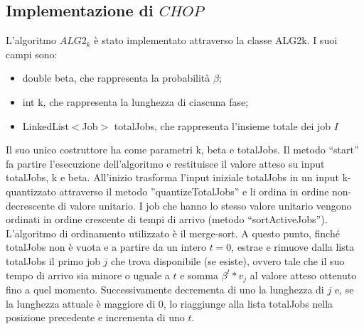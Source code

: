 \documentclass[12pt]{article}
\begin{document}
\subsection{Implementazione di $CHOP$}
L’algoritmo $ALG2_{k}$ è stato implementato attraverso la classe ALG2k. I suoi campi sono:
\begin{itemize}
\item{double beta, che rappresenta la probabilità $\beta$;}
\item{int k, che rappresenta la lunghezza di ciascuna fase;}
\item{LinkedList$<$Job$>$ totalJobs, che rappresenta l’insieme totale dei job $I$}
\end{itemize}
Il suo unico costruttore ha come parametri k, beta e totalJobs. Il metodo “start” fa partire l’esecuzione dell’algoritmo e restituisce il valore atteso su input totalJobs, k e beta. All'inizio trasforma l'input iniziale totalJobs in un input k-quantizzato attraverso il metodo ''quantizeTotalJobs'' e li ordina in ordine non-decrescente di valore unitario. I job che hanno lo stesso valore unitario  vengono ordinati in ordine crescente di tempi di arrivo (metodo “sortActiveJobs”). L’algoritmo di ordinamento utilizzato è il merge-sort. A questo punto, finché totalJobs non è vuota e a partire da un intero $t = 0$, estrae e rimuove dalla lista totalJobs il primo job $j$ che trova disponibile (se esiste), ovvero tale che il suo tempo di arrivo sia minore o uguale a $t$ e somma $\beta^{t} * v_{j}$ al valore atteso ottenuto fino a quel momento. Successivamente decrementa di uno la lunghezza di $j$ e, se la lunghezza attuale è maggiore di 0, lo riaggiunge alla lista totalJobs nella posizione precedente e incrementa di uno $t$.
\end{document}
